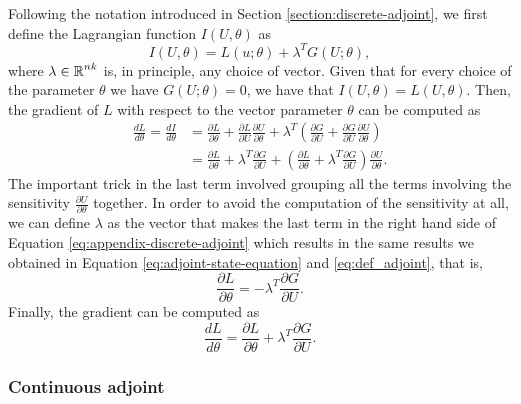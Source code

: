 Following the notation introduced in Section \ref{section:discrete-adjoint}, we first define the Lagrangian function $I(U, \theta)$ as 
\begin{equation}
    I(U, \theta) = L(u; \theta) + \lambda^T G(U; \theta),
\end{equation}
where $\lambda \in \operatorname{\mathbb{R}}^{nk}$ is, in principle, any choice of vector. 
Given that for every choice of the parameter $\theta$ we have $G(U; \theta) = 0$, we have that $I(U, \theta) = L(U, \theta)$.
Then, the gradient of $L$ with respect to the vector parameter $\theta$ can be computed as 
\begin{align}
    \frac{dL}{d\theta}
    = 
    \frac{dI}{d\theta}
    &= 
    \frac{\partial L}{\partial \theta} + \frac{\partial L}{\partial U} \frac{\partial U}{\partial \theta}
    + 
    \lambda^T
    \left( \frac{\partial G}{\partial U} + \frac{\partial G}{\partial U} \frac{\partial U}{\partial \theta} \right) \nonumber
    \\ 
    &= 
    \frac{\partial L}{\partial \theta} + \lambda^T \frac{\partial G}{\partial U} 
    + 
    \left( \frac{\partial L}{\partial \theta} + \lambda^T \frac{\partial G}{\partial U} \right) \frac{\partial U}{\partial \theta}.
    \label{eq:appendix-discrete-adjoint}
\end{align}
The important trick in the last term involved grouping all the terms involving the sensitivity $\frac{\partial U}{\partial \theta}$ together. 
In order to avoid the computation of the sensitivity at all, we can define $\lambda$ as the vector that makes the last term in the right hand side of Equation \eqref{eq:appendix-discrete-adjoint} which results in the same results we obtained in Equation \eqref{eq:adjoint-state-equation} and \eqref{eq:def_adjoint}, that is, 
\begin{equation}
    \frac{\partial L}{\partial \theta} = - \lambda^T \frac{\partial G}{\partial U}.
\end{equation}
Finally, the gradient can be computed as 
\begin{equation}
    \frac{dL}{d\theta} 
    = 
    \frac{\partial L}{\partial \theta} + \lambda^T \frac{\partial G}{\partial U} .
\end{equation}

\subsubsection{Continuous adjoint}


